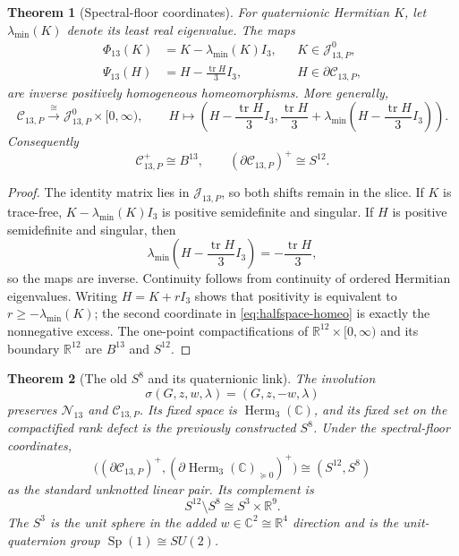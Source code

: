 \documentclass[11pt]{article}
\newtheorem{theorem}{Theorem}[section]
\theoremstyle{definition}
\theoremstyle{remark}
\newcommand{\C}{\mathbb C}
\newcommand{\R}{\mathbb R}
\newcommand{\Herm}{\operatorname{Herm}}
\newcommand{\tr}{\operatorname{tr}}
\newcommand{\Sp}{\operatorname{Sp}}
\newcommand{\cC}{\mathcal C}
\newcommand{\cJ}{\mathcal J}
\newcommand{\cN}{\mathcal N}
\begin{document}
\begin{theorem}[Spectral-floor coordinates]\label{thm:spectral-floor}
For quaternionic Hermitian $K$, let $\lambda_{\min}(K)$ denote its least real eigenvalue.  The maps
\begin{align}
 \Phi_{13}(K)&=K-\lambda_{\min}(K)I_3,
 &&K\in\cJ_{13,P}^0,\label{eq:Phi13}\\
 \Psi_{13}(H)&=H-\frac{\tr H}{3}I_3,
 &&H\in\partial\cC_{13,P},\label{eq:Psi13}
\end{align}
are inverse positively homogeneous homeomorphisms.  More generally,
\begin{equation}\label{eq:halfspace-homeo}
 \cC_{13,P}\xrightarrow{\cong}
 \cJ_{13,P}^0\times[0,\infty),
 \qquad
 H\longmapsto
 \left(H-\frac{\tr H}{3}I_3,
       \frac{\tr H}{3}+\lambda_{\min}\left(H-\frac{\tr H}{3}I_3\right)
 \right).
\end{equation}
Consequently
\begin{equation}\label{eq:compact-topology}
 \boxed{
 \cC_{13,P}^+\cong B^{13},
 \qquad
 (\partial\cC_{13,P})^+\cong S^{12}.}
\end{equation}
\end{theorem}

\begin{proof}
The identity matrix lies in $\cJ_{13,P}$, so both shifts remain in the slice.  If $K$ is trace-free, $K-\lambda_{\min}(K)I_3$ is positive semidefinite and singular.  If $H$ is positive semidefinite and singular, then
\[
 \lambda_{\min}\left(H-\frac{\tr H}{3}I_3\right)
 =-\frac{\tr H}{3},
\]
so the maps are inverse.  Continuity follows from continuity of ordered Hermitian eigenvalues.  Writing $H=K+rI_3$ shows that positivity is equivalent to $r\ge-\lambda_{\min}(K)$; the second coordinate in \eqref{eq:halfspace-homeo} is exactly the nonnegative excess.  The one-point compactifications of $\R^{12}\times[0,\infty)$ and its boundary $\R^{12}$ are $B^{13}$ and $S^{12}$.
\end{proof}

\begin{theorem}[The old $S^8$ and its quaternionic link]\label{thm:S8-in-S12}
The involution
\begin{equation}\label{eq:involution}
 \sigma(G,z,w,\lambda)=(G,z,-w,\lambda)
\end{equation}
preserves $\cN_{13}$ and $\cC_{13,P}$.  Its fixed space is $\Herm_3(\C)$, and its fixed set on the compactified rank defect is the previously constructed $S^8$.  Under the spectral-floor coordinates,
\begin{equation}\label{eq:pair}
 \boxed{
 \bigl((\partial\cC_{13,P})^+,
       (\partial\Herm_3(\C)_{\succeq0})^+\bigr)
 \cong(S^{12},S^8)}
\end{equation}
as the standard unknotted linear pair.  Its complement is
\begin{equation}\label{eq:complement}
 \boxed{S^{12}\setminus S^8\cong S^3\times\R^9.}
\end{equation}
The $S^3$ is the unit sphere in the added $w\in\C^2\cong\R^4$ direction and is the unit-quaternion group $\Sp(1)\cong SU(2)$.
\end{theorem}
\end{document}
